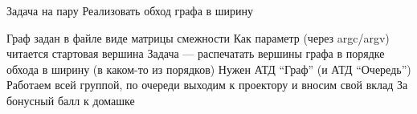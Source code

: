 \documentclass{../../slides-style}
\begin{document}
    
    \begin{frame}[plain]
        \titlepage
    \end{frame}
    
    \begin{frame}{Задача на пару}
        Реализовать обход графа в ширину
        \begin{outline}
            \1 Граф задан в файле виде матрицы смежности
            \1 Как параметр (через argc/argv) читается стартовая вершина
            \1 Задача --- распечатать вершины графа в порядке обхода в ширину (в каком-то из порядков)
            \1 Нужен АТД \enquote{Граф} (и АТД \enquote{Очередь})
            \1 Работаем всей группой, по очереди выходим к проектору и вносим свой вклад
                \2 За бонусный балл к домашке
        \end{outline}
    \end{frame}
\end{document}
